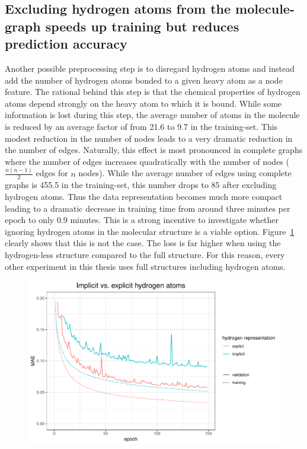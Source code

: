 \subsection{Excluding hydrogen atoms from the molecule-graph speeds up training but reduces prediction accuracy}
\label{sec:no-hydrogens}

Another possible preprocessing step is to disregard hydrogen atoms and instead add the number of hydrogen atoms bonded to a given heavy atom as a node feature. The rational behind this step is that the chemical properties of hydrogen atoms depend strongly on the heavy atom to which it is bound. While some information is lost during this step, the average number of atoms in the molecule is reduced by an average factor of
%
from 21.6 to 9.7 in the training-set. This modest reduction in the number of nodes leads to a very dramatic reduction in the number of edges. Naturally, this effect is most pronounced in complete graphs where the number of edges increases quadratically with the number of nodes ($\frac{n(n - 1)}{2}$ edges for $n$ nodes). While the average number of edges using complete graphs is 455.5 in the training-set, this number drops to 85 after excluding hydrogen atoms. Thus the data representation becomes much more compact leading to a dramatic decrease in training time from around three minutes per epoch to only 0.9 minutes. This is a strong incentive to investigate whether ignoring hydrogen atoms in the molecular structure is a viable option. Figure~\ref{fig:implicit-hydrogens} clearly shows that this is not the case. The loss is far higher when using the hydrogen-less structure compared to the full structure. For this reason, every other experiment in this thesis uses full structures including hydrogen atoms.

\begin{figure}[H]
	\includegraphics[width=\linewidth]{figures/implict-hydrogens.pdf}
	
	\caption{}
	\label{fig:implicit-hydrogens}
\end{figure}

